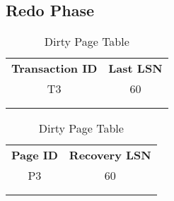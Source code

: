 \subsection{Redo Phase}
\begin{table}[H]
    \begin{minipage}{.5\linewidth}
      \centering
		\begin{tabular}{|c|c|}
		\cline{1-2}
		\textbf{Transaction ID} & \textbf{Last LSN} \\ \cline{1-2}
		T3             & 60       \\ \cline{1-2}
		               &          \\ \cline{1-2}
		               &          \\ \cline{1-2}
		\end{tabular}
      \caption{Transaction Table}

    \end{minipage}%
    \begin{minipage}{.5\linewidth}
      \centering
		\begin{tabular}{|c|c|}
		\cline{1-2}
		\textbf{Page ID} & \textbf{Recovery LSN} \\ \cline{1-2}
		P3      & 60           \\ \cline{1-2}
		        &              \\ \cline{1-2}
		        &              \\ \cline{1-2}
		\end{tabular}
        \caption{Dirty Page Table}

    \end{minipage} 
\end{table}

